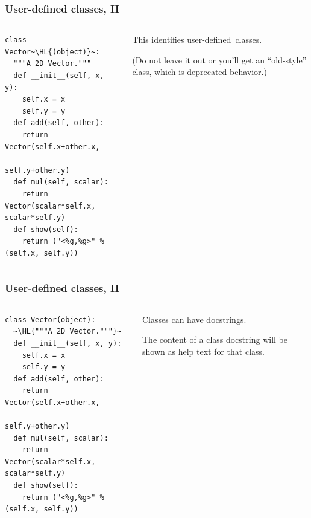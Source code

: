 \documentclass[english,serif,mathserif,xcolor=pdftex,dvipsnames,table]{beamer}
\begin{document}
\begin{frame}[fragile]
  \frametitle{User-defined classes, II}
  \begin{columns}[t]
    \begin{column}{0.5\textwidth}
\begin{lstlisting}
class Vector~\HL{(object)}~:
  """A 2D Vector."""
  def __init__(self, x, y):
    self.x = x
    self.y = y
  def add(self, other):
    return Vector(self.x+other.x,
                  self.y+other.y)
  def mul(self, scalar):
    return Vector(scalar*self.x, scalar*self.y)
  def show(self):
    return ("<%g,%g>" % (self.x, self.y))
\end{lstlisting}
    \end{column}
    \begin{column}{0.5\textwidth}
      \raggedleft
      This identifies user-defined~classes.

      \+
      (Do not leave it out or you'll get an ``old-style'' class, which
      is deprecated behavior.)
    \end{column}
  \end{columns}
\end{frame}


\begin{frame}[fragile]
  \frametitle{User-defined classes, II}
  \begin{columns}[t]
    \begin{column}{0.5\textwidth}
\begin{lstlisting}
class Vector(object):
  ~\HL{"""A 2D Vector."""}~
  def __init__(self, x, y):
    self.x = x
    self.y = y
  def add(self, other):
    return Vector(self.x+other.x,
                  self.y+other.y)
  def mul(self, scalar):
    return Vector(scalar*self.x, scalar*self.y)
  def show(self):
    return ("<%g,%g>" % (self.x, self.y))
\end{lstlisting}
    \end{column}
    \begin{column}{0.5\textwidth}
      \raggedleft
      Classes can have docstrings.

      The content of a class docstring will be shown as help text for
      that class.
    \end{column}
  \end{columns}
\end{frame}
\end{document}
